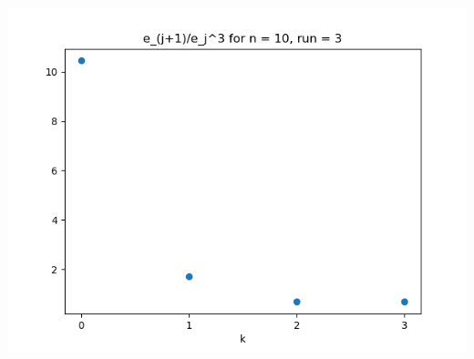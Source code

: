 \documentclass{article}
\begin{document}
\begin{enumerate}
\begin{enumerate}
\begin{center}
			\includegraphics[scale=.4]{hw4 err n = 10 run = 3}
			

\end{center}
\end{enumerate}
\end{enumerate}
\end{document}
